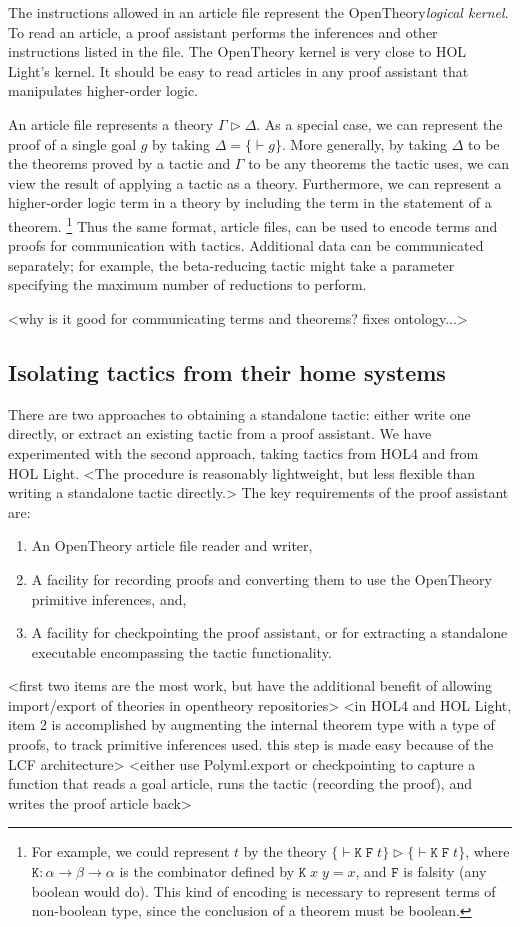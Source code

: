 \documentclass{llncs}
\newcommand{\OpenTheory}{OpenTheory\xspace}
\begin{document}
The instructions allowed in an article file represent the \OpenTheory \emph{logical kernel}.
To read an article, a proof assistant performs the inferences and other instructions listed in the file.
The \OpenTheory kernel is very close to HOL Light's kernel.
It should be easy to read articles in any proof assistant that manipulates higher-order logic.

An article file represents a theory $\Gamma\rhd\Delta$.
As a special case, we can represent the proof of a single goal $g$ by taking $\Delta=\{\vdash g\}$.
More generally, by taking $\Delta$ to be the theorems proved by a tactic and $\Gamma$ to be any theorems the tactic uses, we can view the result of applying a tactic as a theory.
Furthermore, we can represent a higher-order logic term in a theory by including the term in the statement of a theorem. \footnote{For example, we could represent $t$ by the theory $\{\vdash\mathtt{K\;F\;}t\}\rhd\{\vdash\mathtt{K\;F\;}t\}$, where $\mathtt{K}:\alpha\to\beta\to\alpha$ is the combinator defined by $\mathtt{K}\;x\;y=x$, and $\mathtt{F}$ is falsity (any boolean would do).
This kind of encoding is necessary to represent terms of non-boolean type, since the conclusion of a theorem must be boolean.}
Thus the same format, article files, can be used to encode terms and proofs for communication with tactics.
Additional data can be communicated separately; for example, the beta-reducing tactic might take a parameter specifying the maximum number of reductions to perform.

<why is it good for communicating terms and theorems? fixes ontology...>

\subsection{Isolating tactics from their home systems}
There are two approaches to obtaining a standalone tactic: either write one directly, or extract an existing tactic from a proof assistant. 
We have experimented with the second approach, taking tactics from HOL4 and from HOL Light.
<The procedure is reasonably lightweight, but less flexible than writing a standalone tactic directly.>
The key requirements of the proof assistant are:
\begin{enumerate}
\item
An \OpenTheory article file reader and writer,
\item
A facility for recording proofs and converting them to use the \OpenTheory primitive inferences, and,
\item
A facility for checkpointing the proof assistant, or for extracting a standalone executable encompassing the tactic functionality.
\end{enumerate}
<first two items are the most work, but have the additional benefit of allowing import/export of theories in opentheory repositories>
<in HOL4 and HOL Light, item 2 is accomplished by augmenting the internal theorem type with a type of proofs, to track primitive inferences used. this step is made easy because of the LCF architecture>
<either use Polyml.export or checkpointing to capture a function that reads a goal article, runs the tactic (recording the proof), and writes the proof article back>
\end{document}
